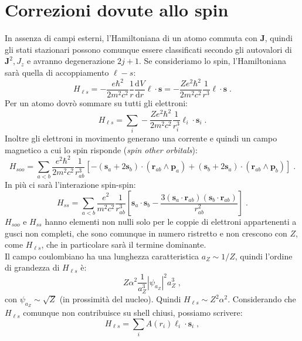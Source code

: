 \documentclass[10pt,a4paper]{report}
\theoremstyle{definition}
\newcommand{\dev}[3][]{\frac{\mathrm{d}^{#1} #2}{\mathrm{d} #3^{#1}}}
\numberwithin{equation}{section}
\begin{document}
\section{Correzioni dovute allo spin}
In assenza di campi esterni, l'Hamiltoniana di un atomo commuta con $\mathbf{J}$, quindi gli stati stazionari possono comunque essere classificati secondo gli autovalori di $\mathbf{J}^2,J_z$ e avranno degenerazione $2j+1$. Se consideriamo lo spin, l'Hamiltoniana sarà quella di accoppiamento $\ell-s$:
\begin{equation}
H_{\ell s}=-\frac{e\hbar^2}{2m^2c^2}\frac{1}{r}\dev{V}{r}\boldsymbol{\ell}\cdot\mathbf{s}=-\frac{Ze^2\hbar^2}{2m^2c^2}\frac{1}{r^3}\boldsymbol{\ell}\cdot\mathbf{s}\;.
\end{equation}
Per un atomo dovrò sommare su tutti gli elettroni:
\begin{equation}
H_{\ell s}=\sum_i -\frac{Ze^2\hbar^2}{2m^2c^2}\frac{1}{r_i^3}\boldsymbol{\ell}_i\cdot\mathbf{s}_i\;.
\end{equation}
Inoltre gli elettroni in movimento generano una corrente e quindi un campo magnetico a cui lo spin risponde (\emph{spin other orbitals}):
\begin{equation}
H_{soo}=\sum_{a<b}\frac{e^2\hbar^2}{2m^2c^2}\frac{1}{r_{ab}^3}\left[-(\mathbf{s}_a+2\mathbf{s}_b)\cdot(\mathbf{r}_{ab}\wedge\mathbf{p}_a)+(\mathbf{s}_b+2\mathbf{s}_a)\cdot(\mathbf{r}_{ab}\wedge\mathbf{p}_b)\right]\;.
\end{equation}
In più ci sarà l'interazione spin-spin:
\begin{equation}
H_{ss}=\sum_{a<b}\frac{e^2}{m^2c^2}\frac{1}{r_{ab}^3}\left[\mathbf{s}_a\cdot\mathbf{s}_b-\frac{3(\mathbf{s}_a\cdot\mathbf{r}_{ab})(\mathbf{s}_b\cdot\mathbf{r}_{ab})}{r^2_{ab}}\right]\;.
\end{equation}
$H_{soo}$ e $H_{ss}$ hanno elementi non nulli solo per le coppie di elettroni appartenenti a gusci non completi, che sono comunque in numero ristretto e non crescono con $Z$, come $H_{\ell s}$, che in particolare sarà il termine dominante. \\
Il campo coulombiano ha una lunghezza caratteristica $a_Z\sim 1/Z$, quindi l'ordine di grandezza di $H_{\ell s}$ è:
$$
Z\alpha^2\frac{1}{a_Z^3}|\psi_{a_Z}|^2 a_Z^3\;,
$$
con $\psi_{a_Z}\sim \sqrt{Z}$ (in prossimità del nucleo). Quindi $H_{\ell s}\sim Z^2\alpha^2$. Considerando che $H_{\ell s}$ comunque non contribuisce su shell chiusi, possiamo scrivere:
\begin{equation}
H_{\ell s}=\sum_i A(r_i)\boldsymbol{\ell}_i\cdot\mathbf{s}_i\;,
\end{equation}
\end{document}
